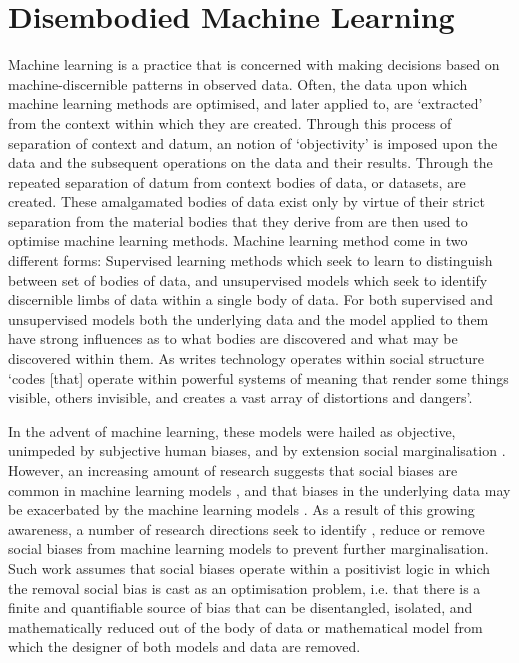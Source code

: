 \section{Disembodied Machine Learning}
Machine learning is a practice that is concerned with making decisions based on machine-discernible patterns in observed data. Often, the data upon which machine learning methods are optimised, and later applied to, are `extracted' from the context within which they are created. Through this process of separation of context and datum, an notion of `objectivity' is imposed upon the data and the subsequent operations on the data and their results. Through the repeated separation of datum from context bodies of data, or datasets, are created. These amalgamated bodies of data exist only by virtue of their strict separation from the material bodies that they derive from are then used to optimise machine learning methods. Machine learning method come in two different forms: Supervised learning methods which seek to learn to distinguish between set of bodies of data, and unsupervised models which seek to identify discernible limbs of data within a single body of data. For both supervised and unsupervised models both the underlying data and the model applied to them have strong influences as to what bodies are discovered and what may be discovered within them. As \citet{Benjamin:2019} writes technology operates within social structure `codes [that] operate within powerful systems of meaning that render some things visible, others invisible, and creates a vast array of distortions and dangers'.\vspace{5mm}

In the advent of machine learning, these models were hailed as objective, unimpeded by subjective human biases, and by extension social marginalisation \citep{oneil:2017}. However, an increasing amount of research suggests that social biases are common in machine learning models \citep{Shah:2020,Buolamwini:2018,Agarwal:2018}, and that biases in the underlying data may be exacerbated by the machine learning models \citep{Zhao:2017,Jia:2020}. As a result of this growing awareness, a number of research directions seek to identify \citep{Shah:2020,Bender-Friedman:2018,Mitchell:2019,Buolamwini:2018}, reduce or remove social biases \citep{Zhao:2017,Agarwal:2018,Romanov:2019,Jia:2020} from machine learning models to prevent further marginalisation. Such work assumes that social biases operate within a positivist logic in which the removal social bias is cast as an optimisation problem, i.e. that there is a finite and quantifiable source of bias that can be disentangled, isolated, and mathematically reduced out of the body of data or mathematical model from which the designer of both models and data are removed.

